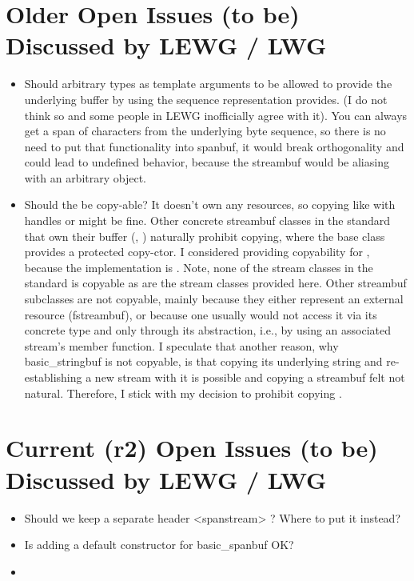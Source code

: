 \documentclass[ebook,11pt,article]{memoir}
\begin{document}
\section{Older Open Issues (to be) Discussed by LEWG / LWG}
\begin{itemize}
\item Should arbitrary types as template arguments to  be allowed to provide the underlying buffer by using the  sequence representation  provides. (I do not think so and some people in LEWG inofficially agree with it). You can always get a span of characters from the underlying byte sequence, so there is no need to put that functionality into spanbuf, it would break orthogonality and could lead to undefined behavior, because the streambuf would be aliasing with an arbitrary object.
\item Should the  be copy-able? It doesn't own any resources, so copying like with handles or  might be fine. Other concrete streambuf classes in the standard that own their buffer (, ) naturally prohibit copying, where the base class  provides a protected copy-ctor. I considered providing copyability for , because the implementation is . Note, none of the stream classes in the standard is copyable as are the stream classes provided here. Other streambuf subclasses are not copyable, mainly because they either represent an external resource (fstreambuf), or because one usually would not access it via its concrete type and only through its  abstraction, i.e., by using an associated stream's  member function. I speculate that another reason, why basic_stringbuf is not copyable, is that copying its underlying string and re-establishing a new stream with it is possible and copying a streambuf felt not natural. Therefore, I stick with my decision to prohibit copying .
\end{itemize}


\section{Current (r2) Open Issues (to be) Discussed by LEWG / LWG}
\begin{itemize}
\item Should we keep a separate header <spanstream> ? Where to put it instead? 
\item Is adding a default constructor for basic_spanbuf OK? 
\item {}
\end{itemize}
\end{document}
